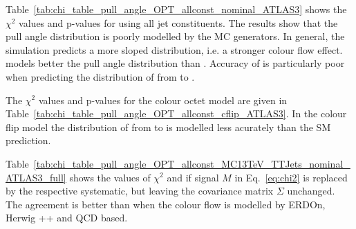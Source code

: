 Table~\ref{tab:chi_table_pull_angle_OPT_allconst_nominal_ATLAS3} shows the $\chi^{2}$ values and p-values for \pullangle using all jet constituents. The results show that the pull angle distribution is poorly modelled by the MC generators. In general, the simulation predicts a more sloped distribution, i.e. a stronger colour flow effect. \HERWIGpp models better the pull angle distribution than . Accuracy of  is particularly poor when predicting the distribution of \pullangle from \scndleadingjet to \leadingjet.

The $\chi^{2}$ values and p-values for the \PW colour octet model are given in Table~\ref{tab:chi_table_pull_angle_OPT_allconst_cflip_ATLAS3}. In the colour flip model the distribution of \pullangle from \leadingjet to \scndleadingjet is modelled less acurately than the SM prediction.
  
Table~\ref{tab:chi_table_pull_angle_OPT_allconst_MC13TeV_TTJets_nominal_ATLAS3_full} shows the values of $\chi^{2}$ and if signal $M$ in Eq.~\ref{eq:chi2} is replaced by the respective systematic, but leaving the covariance matrix $\Sigma$ unchanged. The agreement is better than \ttbar when the colour flow is modelled by \ttbar ERDOn, \ttbar Herwig ++ and \ttbar QCD based.




















